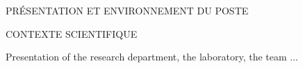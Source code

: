 \def\jobannouncement{FICHE DE POSTE}
\def\positiontitle{Intitulé de poste}
\def\positiontitleval{Post-doctorant.e en informatique}
\def\department{DEPARTEMENT/Postdoc/2yrs}
\def\subtask{sujet}

%
%


\begin{redbox}{PRÉSENTATION ET ENVIRONNEMENT DU POSTE}

\end{redbox}

\begin{redbox}{CONTEXTE SCIENTIFIQUE}

Presentation of the research department, the laboratory, the team ...
\end{redbox}


